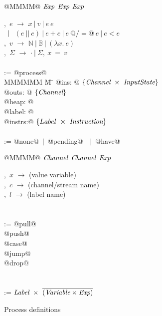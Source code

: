 
\begin{figure}
\begin{minipage}[t]{0.4\textwidth}
\begin{tabbing}
\Instr \TABDEF @MMMM@  \TABSKIP $\textit{Exp}$ \TABSKIP $\textit{Exp}$ \TABSKIP $\textit{Exp}$ \kill

\Exp,~$e$ \> $\to$ \> $x~|~v~|~e~e $ \\
  \> $\enskip|~$ \> $ (e~||~e) ~|~ e+e ~|~ e~@/=@~e ~|~ e < e$ \\
\Value,~$v$ \> $\to$ \> $\mathbb{N}~|~\mathbb{B}~|~(\lambda{}x.~e)$ \\
\Heap,~$\Sigma$ \> $\to$ \> $\cdot~|~\Sigma,~x~=~v$ \\
\\

\Proc \>:=\> @process@ \\
MMMMMM \= M \= \kill
\> \> @ins:   @  $\{\textit{Channel} ~\times~ \textit{InputState}\}$ \\
\> \> @outs:  @  $\{ \textit{Channel} \}$ \\
\> \> @heap:  @  \Heap \\
\> \> @label: @  \Label \\
\> \> @instrs:@  $\{Label ~\times~ \textit{Instruction}\}$ \\
\\
\Instr \TABDEF \kill
\InputState \> := \> @none@~$|$~@pending@~\Value~$|$~@have@

\end{tabbing}
\end{minipage}
\begin{minipage}[t]{0.05\textwidth}
\quad
\end{minipage}
\begin{minipage}[t]{0.4\textwidth}
\begin{tabbing}
\Instr \TABDEF @MMMM@  \TABSKIP $\textit{Channel}$ \TABSKIP $\textit{Channel}$ \TABSKIP $\textit{Exp}$ \kill

\Var,~$x$ \> $\to$ \> (value variable) \\
\Chan,~$c$ \> $\to$ \> (channel/stream name) \\
\Label,~$l$ \> $\to$ \> (label name) \\
\\
\\

\Instr
    \> :=\> @pull@  \> \Chan  \> \Var  \> \Next \\
    \TABALT @push@  \> \Chan  \> \Exp  \> \Next \\
    \TABALT @case@  \> \Exp   \> \Next \> \Next \\
    \TABALT @jump@  \>        \>       \> \Next \\
    \TABALT @drop@  \> \Chan  \>       \> \Next \\
\\
\\
\Next \> := \> $\textit{Label}~\times~\overline{(\textit{Variable} \times \textit{Exp})}$ \\
\end{tabbing}
\end{minipage}
\caption{Process definitions}
\label{fig:Process:Def}
\end{figure}

